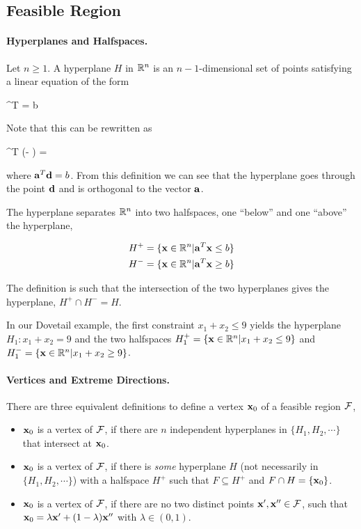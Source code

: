 \subsection{Feasible Region}

\paragraph{Hyperplanes and Halfspaces.} Let $n \geq 1$. A hyperplane $H$ in $\mathbb{R}^n$ is an $n-1$-dimensional set of points satisfying a linear equation of the form

\bee
\abf^T \xbf = b
\eee

Note that this can be rewritten as

\bee
\abf^T (\xbf - \dbf) = \zerobf
\eee

where $\mathbf{a}^T \mathbf{d} = b$. From this definition we can see that the hyperplane goes through the point $\mathbf{d}$ and is orthogonal to the vector $\mathbf{a}$.

The hyperplane separates $\mathbb{R}^n$ into two halfspaces, one ``below'' and one ``above'' the hyperplane,

\begin{align*}
  H^+ &= \{ \mathbf{x} \in \mathbb{R}^n | \mathbf{a}^T \mathbf{x} \leq b\} \\
  H^- &= \{ \mathbf{x} \in \mathbb{R}^n | \mathbf{a}^T \mathbf{x} \geq b\}
\end{align*}

The definition is such that the intersection of the two hyperplanes gives the hyperplane, $H^+ \cap H^- = H$.

In our Dovetail example, the first constraint $x_1 + x_2 \leq 9$ yields the hyperplane $H_1: x_1 + x_2 = 9$ and the two halfspaces $H_1^+ =  \{ \mathbf{x} \in \mathbb{R}^n | x_1 + x_2 \leq 9 \}$ and $H_1^- =  \{ \mathbf{x} \in \mathbb{R}^n | x_1 + x_2 \geq 9 \}$.

\paragraph{Vertices and Extreme Directions.} There are three equivalent definitions to define a vertex $\mathbf{x}_0$ of a feasible region $\mathcal{F}$,

\begin{itemize}
  \item $\mathbf{x}_0$ is a vertex of $\mathcal{F}$, if there are $n$ independent hyperplanes in $\{H_1, H_2, \cdots\}$ that intersect at $\mathbf{x}_0$.

  \item $\mathbf{x}_0$ is a vertex of $\mathcal{F}$, if there is \emph{some} hyperplane $H$ (not necessarily in $\{H_1, H_2, \cdots\}$) with a halfspace $H^+$ such that $F \subseteq H^+$ and $F \cap H = \{ \mathbf{x}_0 \}$.

  \item $\mathbf{x}_0$ is a vertex of $\mathcal{F}$, if there are no two distinct points $\mathbf{x}', \mathbf{x}'' \in \mathcal{F}$, such that $\mathbf{x}_0 = \lambda \mathbf{x}' + (1-\lambda) \mathbf{x}''$ with $\lambda \in (0,1)$.

\end{itemize}

